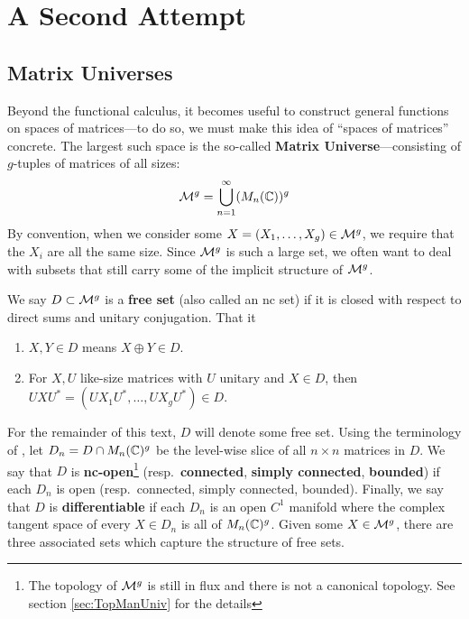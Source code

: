 \chapter{A Second Attempt}\label{ch:SecondAttempt}
\section{Matrix Universes}%
\label{sec:MatUniv}

Beyond the functional calculus, it becomes useful to construct general functions
on spaces of matrices---to do so, we must make this idea of ``spaces of
matrices'' concrete. The largest such space is the so-called \textbf{Matrix
  Universe}---consisting of \(g\)-tuples of matrices of all sizes:
\[
  \mathcal{M}^g = \bigcup_{n=1}^\infty (M_n(\mathbb{C}))^g
\]
By convention, when we consider some
\(X = \left( X_1, \dots , X_g \right) \in \mathcal{M}^g\), we require that the \(X_i\)
are all the same size. Since \(\mathcal{M}^g\) is such a large set, we often want to
deal with subsets that still carry some of the implicit structure of \(\mathcal{M}^g\).
\begin{definition}
  \label{def:FreeSet}
  We say \(D \subset \mathcal{M}^g\) is a \textbf{free set} (also called an nc set) if it is closed with respect
  to direct sums and unitary conjugation. That it
  \begin{enumerate}
    \item \(X,Y \in D \) means \(X\oplus Y \in D\).
    \item For \(X,U\) like-size matrices with \(U\) unitary and \(X \in D\),
          then \(U X U^* = \left( UX_1U^*, \dots , UX_g U^*  \right) \in D \).
  \end{enumerate}
\end{definition}

For the remainder of this text, \(D\) will denote some free set. Using the
terminology of \cite{pascoeFreeNoncommutativePrincipal2020}, let
\(D_n = D \cap M_n(\mathbb{C})^g\) be the level-wise slice of all \(n \times n\)
matrices in \(D\). We say that \(D\) is \textbf{nc-open}\footnote{The topology of \(\mathcal{M}^g\)
  is still in flux and there is not a canonical topology. See section \ref{sec:TopManUniv} for
  the details } (resp.\ \textbf{connected}, \textbf{simply connected}, \textbf{bounded}) if each \(D_n\) is open
(resp.\ connected, simply connected, bounded). Finally, we say that \(D\) is
\textbf{differentiable} if each \(D_n\) is an open \(C^1\) manifold where the
complex tangent space of every \(X \in D_n\) is all of \(M_n(\mathbb{C})^g\).
Given some \(X \in \mathcal{M}^{g} \), there are three associated sets which capture the
structure of free sets.


